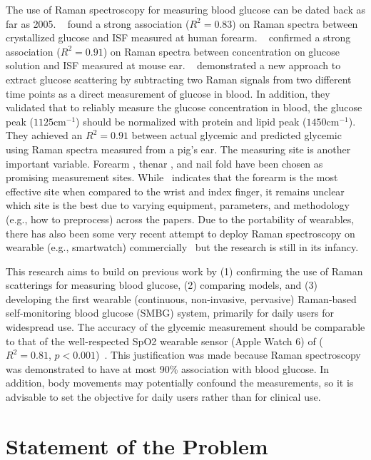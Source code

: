 The use of Raman spectroscopy for measuring blood glucose can be dated back as far as 2005.
~\cite{forearm2005} found a strong association ($R^2 = 0.83$) on Raman spectra between crystallized glucose and ISF measured at human forearm.
~\cite{solutionGlucose} confirmed a strong association ($R^2 = 0.91$) on Raman spectra between concentration on glucose solution and ISF measured at mouse ear.
~\cite{directGlucose} demonstrated a new approach to extract glucose scattering by subtracting two Raman signals from two different time points as a direct measurement of glucose in blood.
In addition, they validated that to reliably measure the glucose concentration in blood, the glucose peak ($1125 \text{cm}^{-1}$) should be normalized with protein and lipid peak ($1450 \text{cm}^{-1}$).
They achieved an $R^2 = 0.91$ between actual glycemic and predicted glycemic using Raman spectra measured from a pig's ear.
The measuring site is another important variable. Forearm \citep{forearm2005, forearm2014}, thenar \citep{glucobeam}, and nail fold \citep{ramanNailFold2019} have been chosen as promising measurement sites.
While~\cite{sitecompare} indicates that the forearm is the most effective site when compared to the wrist and index finger, it remains unclear which site is the best due to varying equipment, parameters, and methodology (e.g., how to preprocess) across the papers.
Due to the portability of wearables, there has also been some very recent attempt to deploy Raman spectroscopy on wearable (e.g., smartwatch) commercially~\cite{ramanGlucoseWatch} but the research is still in its infancy.

This research aims to build on previous work by 
(1) confirming the use of Raman scatterings for measuring blood glucose, 
(2) comparing models, and 
(3) developing the first wearable (continuous, non-invasive, pervasive) Raman-based self-monitoring blood glucose (SMBG) system, primarily for daily users for widespread use.
The accuracy of the glycemic measurement should be comparable to that of the well-respected SpO2 wearable sensor (Apple Watch 6) of ($R^2 = 0.81$, $p < 0.001$)~\citep{applewatchaccuracy}.
This justification was made because Raman spectroscopy was demonstrated to have at most 90\% association with blood glucose. 
In addition, body movements may potentially confound the measurements, so it is advisable to set the objective for daily users rather than for clinical use.


\section{Statement of the Problem}

